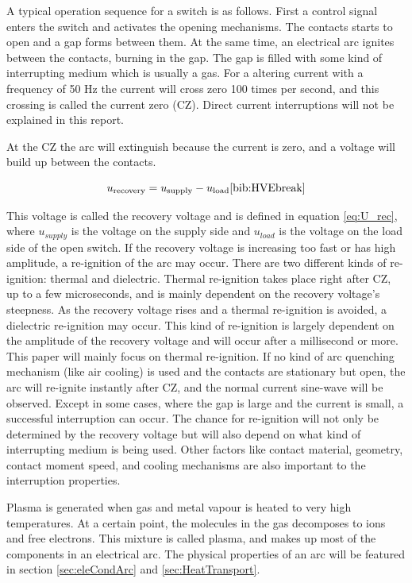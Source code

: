 \documentclass[10pt,a4paper,twoside]{article}
\begin{document}
A typical operation sequence for a switch is as follows. First a control signal enters the switch and activates the opening mechanisms. The contacts starts to open and a gap forms between them. At the same time, an electrical arc ignites between the contacts, burning in the gap. The gap is filled with some kind of interrupting medium which is usually a gas. For a altering current with a frequency of 50 Hz the current will cross zero 100 times per second, and this crossing is called the current zero (CZ). Direct current interruptions will not be explained in this report. 

At the CZ the arc will extinguish because the current is zero, and a voltage will build up between the contacts.

\begin{equation} \label{eq:U_rec}
u_\mathrm{{recovery}}=u_\mathrm{{supply}}-u_\mathrm{{load}} \cite{bib:HVEbreak}
\end{equation} 

This voltage is called the recovery voltage and is defined in equation \eqref{eq:U_rec}, where $u_{supply}$ is the voltage on the supply side and $u_{load}$ is the voltage on the load side of the open switch. If the recovery voltage is increasing too fast or has high amplitude, a re-ignition of the arc may occur. There are two different kinds of re-ignition: thermal and dielectric. Thermal re-ignition takes place right after CZ, up to a few microseconds, and is mainly dependent on the recovery voltage's steepness. As the recovery voltage rises and a thermal re-ignition is avoided, a dielectric re-ignition may occur. This kind of re-ignition is largely dependent on the amplitude of the recovery voltage and will occur after a millisecond or more. This paper will mainly focus on thermal re-ignition. If no kind of arc quenching mechanism (like air cooling) is used and the contacts are stationary but open, the arc will re-ignite instantly after CZ, and the normal current sine-wave will be observed. Except in some cases, where the gap is large and the current is small, a successful interruption can occur. The chance for re-ignition will not only be determined by the recovery voltage but will also depend on what kind of interrupting medium is being used. Other factors like contact material, geometry, contact moment speed, and cooling mechanisms are also important to the interruption properties.

Plasma is generated when gas and metal vapour is heated to very high temperatures. At a certain point, the molecules in the gas decomposes to ions and free electrons. This mixture is called plasma, and makes up most of the components in an electrical arc. The physical properties of an arc will be featured in section \ref{sec:eleCondArc} and \ref{sec:HeatTransport}. 
\end{document}
